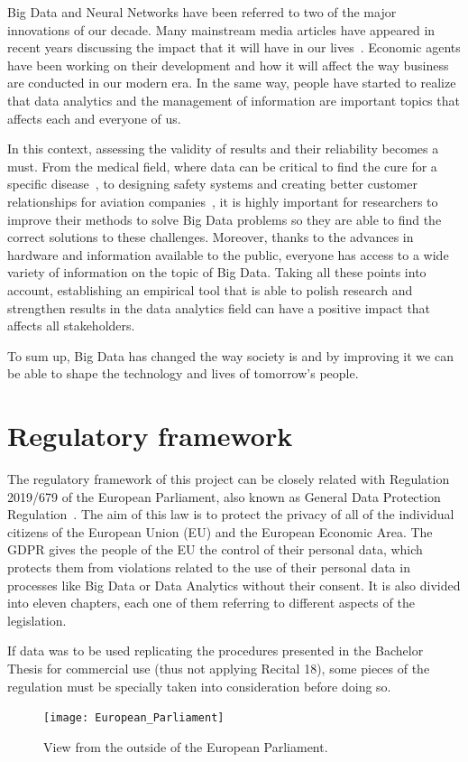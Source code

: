 Big Data and Neural Networks have been referred to two of the major innovations of our decade. Many mainstream media articles have appeared in recent years discussing the impact that it will have in our lives~\cite{Forbes_Article}. Economic agents have been working on their development and how it will affect the way business are conducted in our modern era. In the same way, people have started to realize that data analytics and the management of information are important topics that affects each and everyone of us.

In this context, assessing the validity of results and their reliability becomes a must. From the medical field, where data can be critical to find the cure for a specific disease~\cite{Nature_Article}, to designing safety systems and creating better customer relationships for aviation companies~\cite{Article_Aviation}, it is highly important for researchers to improve their methods to solve Big Data problems so they are able to find the correct solutions to these challenges. Moreover, thanks to the advances in hardware and information available to the public, everyone has access to a wide variety of information on the topic of Big Data. Taking all these points into account, establishing an empirical tool that is able to polish research and strengthen results in the data analytics field can have a positive impact that affects all stakeholders.

To sum up, Big Data has changed the way society is and by improving it we can be able to shape the technology and lives of tomorrow's people.

\section{Regulatory framework}

The regulatory framework of this project can be closely related with Regulation 2019/679 of the European Parliament, also known as General Data Protection Regulation~\cite{GDPR}. The aim of this law is to protect the privacy of all of the individual citizens of the European Union (EU) and the European Economic Area. The GDPR gives the people of the EU the control of their personal data, which protects them from violations related to the use of their personal data in processes like Big Data or Data Analytics without their consent. It is also divided into eleven chapters, each one of them referring to different aspects of the legislation. 

If data was to be used replicating the procedures presented in the Bachelor Thesis for commercial use (thus not applying Recital 18), some pieces of the regulation must be specially taken into consideration before doing so. %
\begin{figure}[H]
	\caption{View from the outside of the European Parliament.}
	\label{fig:European_Parliament}
	\texttt{[image: European\_Parliament]}
\end{figure}

